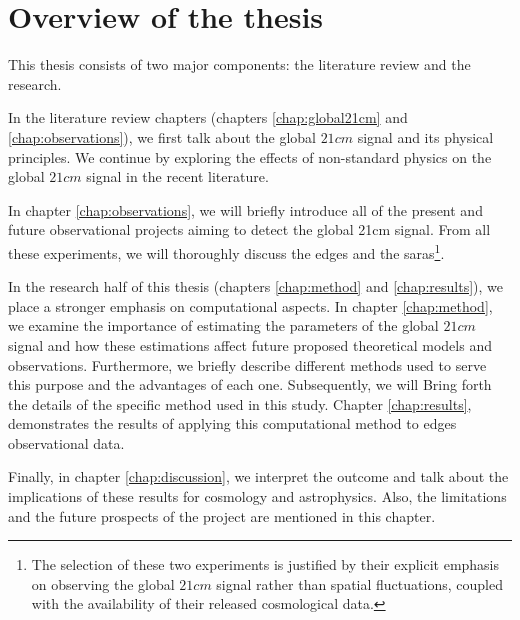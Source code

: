 \documentclass[12pt, TexShade, letterpaper]{report}
\begin{document}
\section{Overview of the thesis}
This thesis consists of two major components: the literature review and the research.\par
In the literature review chapters (chapters \ref{chap:global21cm} and \ref{chap:observations}), we first talk about the global $21cm$ signal and its physical principles. We continue by exploring the effects of non-standard physics on the global $21cm$ signal in the recent literature. \par
In chapter \ref{chap:observations}, we will briefly introduce all of the present and future observational projects aiming to detect the global 21cm signal. From all these experiments, we will thoroughly discuss the \gls{edges} and the \gls{saras}\footnote{The selection of these two experiments is justified by their explicit emphasis on observing the global $21cm$ signal rather than spatial fluctuations, coupled with the availability of their released cosmological data.}.\par
In the research half of this thesis (chapters \ref{chap:method} and \ref{chap:results}), we place a stronger emphasis on computational aspects. 
In chapter \ref{chap:method}, we examine the importance of estimating the parameters of the global $21cm$ signal and how these estimations affect future proposed theoretical models and observations. Furthermore, we briefly describe different methods used to serve this purpose and the advantages of each one.
Subsequently, we will Bring forth the details of the specific method used in this study. 
Chapter \ref{chap:results}, demonstrates the results of applying this computational method to \gls{edges} observational data.\par

Finally, in chapter \ref{chap:discussion}, we interpret the outcome and talk about the implications of these results for cosmology and astrophysics. Also, the limitations and the future prospects of the project are mentioned in this chapter.\par
\end{document}
